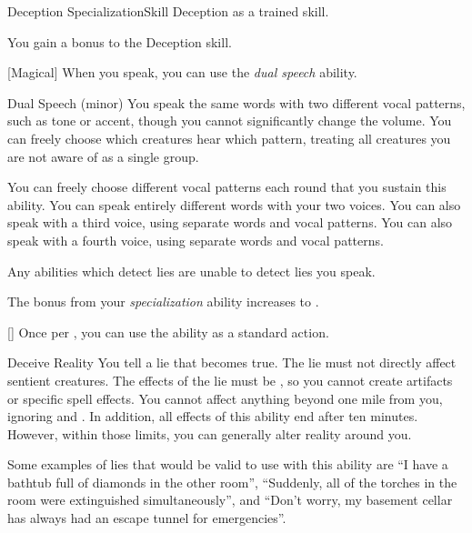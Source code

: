     \begin{feat}{Deception Specialization}{Skill}
        \featpre Deception as a trained skill.

         You gain a  bonus to the Deception skill.

        [Magical] When you speak, you can use the \textit{dual speech} ability.
        \begin{sustainability}{Dual Speech}{ (minor)}
            \rankline
            You speak the same words with two different vocal patterns, such as tone or accent, though you cannot significantly change the volume.
            You can freely choose which creatures hear which pattern, treating all creatures you are not aware of as a single group. 

            You can freely choose different vocal patterns each round that you sustain this ability.
            \rankline
             You can speak entirely different words with your two voices.
             You can also speak with a third voice, using separate words and vocal patterns.
             You can also speak with a fourth voice, using separate words and vocal patterns.
        \end{sustainability}

         Any  abilities which detect lies are unable to detect lies you speak.

         The bonus from your \textit{specialization} ability increases to .

        [] Once per , you can use the  ability as a standard action.
        \begin{activeability}{Deceive Reality}
            \rankline
            You tell a lie that becomes true.
            The lie must not directly affect sentient creatures.
            The effects of the lie must be , so you cannot create artifacts or specific spell effects.
            You cannot affect anything beyond one mile from you, ignoring  and .
            In addition, all effects of this ability end after ten minutes.
            However, within those limits, you can generally alter reality around you.

            Some examples of lies that would be valid to use with this ability are ``I have a bathtub full of diamonds in the other room'', ``Suddenly, all of the torches in the room were extinguished simultaneously'', and ``Don't worry, my basement cellar has always had an escape tunnel for emergencies''.
        \end{activeability}
    \end{feat}


